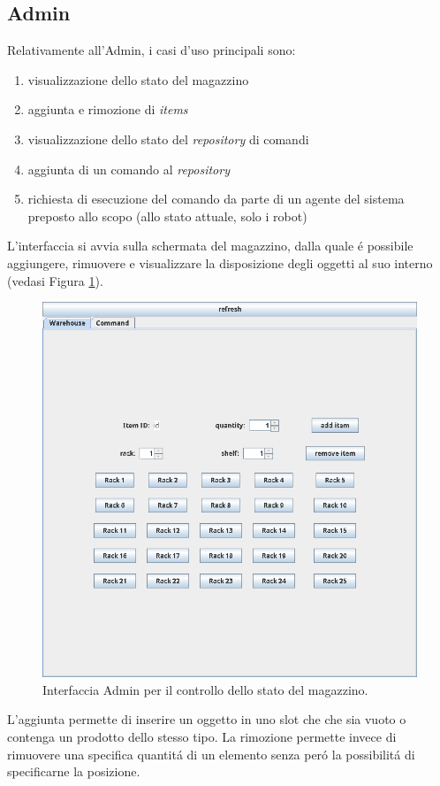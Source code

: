 \subsection{Admin}
Relativamente all'Admin, i casi d'uso principali sono:
\begin{enumerate}
    \item visualizzazione dello stato del magazzino
    \item aggiunta e rimozione di \textit{items}
    \item visualizzazione dello stato del \textit{repository} di comandi
    \item aggiunta di un comando al \textit{repository}
    \item richiesta di esecuzione del comando da parte di un agente del sistema preposto allo scopo (allo stato attuale, solo i robot)
\end{enumerate}
L'interfaccia si avvia sulla schermata del magazzino, dalla quale \'e possibile aggiungere, rimuovere e visualizzare la disposizione degli oggetti al suo interno (vedasi Figura \ref{fig:application-warehouse}).
\begin{figure}[!ht]\centering
    \includegraphics[width=.75\textwidth]{section/usage_examples/figure/application-warehouse.png}
    \caption{Interfaccia Admin per il controllo dello stato del magazzino.}
    \label{fig:application-warehouse}
\end{figure}
L'aggiunta permette di inserire un oggetto in uno slot che che sia vuoto o contenga un prodotto dello stesso tipo. La rimozione permette invece di rimuovere una specifica quantit\'a di un elemento senza per\'o la possibilit\'a di specificarne la posizione.
